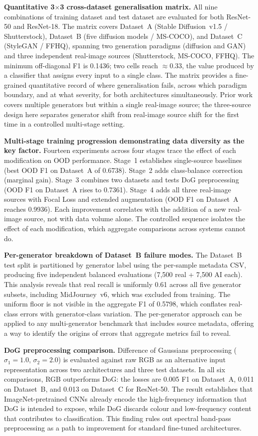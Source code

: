 \textbf{Quantitative 3$\times$3 cross-dataset generalisation matrix.} All nine
combinations of training dataset and test dataset are evaluated for both ResNet-50 and
ResNet-18. The matrix covers Dataset~A (Stable Diffusion~v1.5 / Shutterstock),
Dataset~B (five diffusion models / MS-COCO), and Dataset~C (StyleGAN / FFHQ), spanning
two generation paradigms (diffusion and GAN) and three independent real-image sources
(Shutterstock, MS-COCO, FFHQ). The minimum off-diagonal F1 is 0.1436; two cells
reach $\approx 0.33$, the value produced by a classifier that assigns every input to a
single class. The matrix provides a fine-grained quantitative record of where
generalisation fails, across which paradigm boundary, and at what severity, for both
architectures simultaneously. Prior work covers multiple generators but within a single
real-image source; the three-source design here separates generator shift from real-image
source shift for the first time in a controlled multi-stage setting.

\textbf{Multi-stage training progression demonstrating data diversity as the key factor.}
Fourteen experiments across four stages trace the effect of each modification
on OOD performance. Stage~1 establishes single-source baselines (best OOD F1 on Dataset~A
of 0.6738). Stage~2 adds class-balance correction (marginal gain). Stage~3 combines two
datasets and tests DoG preprocessing (OOD F1 on Dataset~A rises to 0.7361). Stage~4
adds all three real-image sources with Focal Loss and extended augmentation (OOD F1 on
Dataset~A reaches 0.9936). Each improvement correlates with the addition of a new
real-image source, not with data volume alone. The controlled sequence isolates the
effect of each modification, which aggregate comparisons across systems cannot do.

\textbf{Per-generator breakdown of Dataset~B failure modes.} The Dataset~B test split is
partitioned by generator label using the per-sample metadata CSV, producing five
independent balanced evaluations (7,500 real + 7,500 AI each). This analysis reveals
that real recall is uniformly 0.61 across all five generator subsets, including
MidJourney~v6, which was excluded from training. The uniform floor is not visible in the
aggregate F1 of 0.5798, which conflates real-class errors with generator-class variation.
The per-generator approach can be applied to any multi-generator benchmark that includes 
source metadata, offering a way to identify the origins of errors that aggregate metrics fail to reveal.


\textbf{DoG preprocessing comparison.} Difference of Gaussians preprocessing
($\sigma_1=1.0$, $\sigma_2=2.0$) is evaluated against raw RGB as an alternative input
representation across two architectures and three test datasets. In all six comparisons,
RGB outperforms DoG: the losses are 0.005 F1 on Dataset~A, 0.011 on Dataset~B, and 0.013
on Dataset~C for ResNet-50. The result establishes that ImageNet-pretrained CNNs already
encode the high-frequency information that DoG is intended to expose, while DoG discards
colour and low-frequency content that contributes to classification. This finding rules
out spectral band-pass preprocessing as a path to improvement for standard fine-tuned
architectures.

